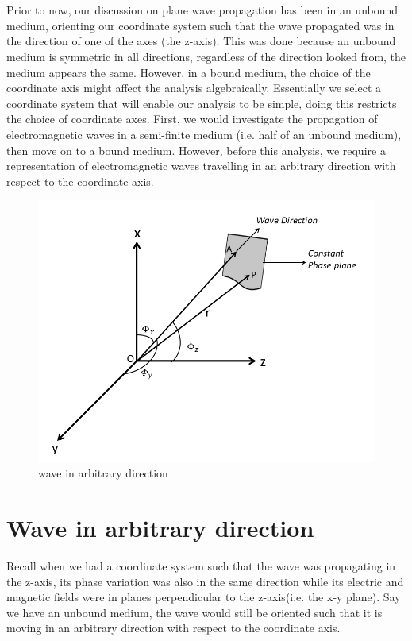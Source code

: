 \section{}
Prior to now, our discussion on plane wave propagation has been in an unbound medium, orienting our coordinate system such that the wave propagated was in the direction of one of the axes (the z-axis). This was done because an unbound medium is symmetric in all directions, regardless of the direction looked from, the medium appears the same.
However, in a bound medium, the choice of the coordinate axis might affect the analysis algebraically.
Essentially we select a coordinate system that will enable our analysis to be simple, doing this restricts the choice of coordinate axes. First, we would investigate the propagation of electromagnetic waves in a semi-finite medium (i.e. half of an unbound medium), then move on to a bound medium. However, before this analysis, we require a representation of electromagnetic waves travelling in an arbitrary direction with respect to the coordinate axis.
\begin{figure}[h]
\centering
\includegraphics[scale=0.43]{graphics/wave_in_arbitrary_direction}
\caption{wave in arbitrary direction}
\label{fig:wave_in_arbitrary_direction}
\end{figure}

\section{Wave in arbitrary direction}
Recall when we had a coordinate system such that the wave was propagating in the z-axis, its phase variation was also in the same direction while its electric and magnetic fields were in planes perpendicular to the z-axis(i.e. the x-y plane).
Say we have an unbound medium, the wave would still be oriented such that it is moving in an arbitrary direction with respect to the coordinate axis.

